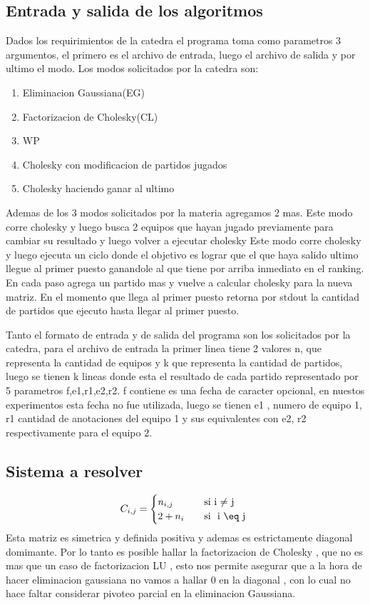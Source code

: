 \subsection{Entrada y salida de los algoritmos}

Dados los requirimientos de la catedra el programa toma como parametros 3 argumentos, el primero es el archivo de entrada, luego el archivo de salida y
por ultimo el modo. Los modos solicitados por la catedra son:
\begin{enumerate}
    \item Eliminacion Gaussiana(EG)
    \item Factorizacion de Cholesky(CL)
    \item WP
    \item Cholesky con modificacion de partidos jugados
    \item Cholesky haciendo ganar al ultimo
\end{enumerate}
Ademas de los 3 modos solicitados por la materia agregamos 2 mas.
Este modo corre cholesky y luego busca 2 equipos que hayan jugado previamente para cambiar su resultado y luego volver a ejecutar cholesky
Este modo corre cholesky y luego ejecuta un ciclo donde el objetivo es lograr que el que haya salido ultimo llegue al primer puesto ganandole
al que tiene por arriba inmediato en el ranking. En cada paso agrega un partido mas y vuelve a calcular cholesky para la nueva matriz.
En el momento que llega al primer puesto retorna por stdout la cantidad de partidos que ejecuto hasta llegar al primer puesto.

Tanto el formato de entrada y de salida del programa son los solicitados por la catedra, para el archivo de entrada la primer linea tiene 2 valores n,
que representa la cantidad de equipos  y k que representa la cantidad de partidos,
luego se tienen k lineas donde esta el resultado de cada partido representado por 5 parametros f,e1,r1,e2,r2.
f contiene es una fecha de caracter opcional, en nuestos experimentos esta fecha no fue utilizada, luego se tienen e1 , numero de equipo 1,
r1 cantidad de anotaciones del equipo 1 y sus equivalentes con e2, r2 respectivamente para el equipo 2.


\subsection{Sistema a resolver}

\[ C_{i,j} =
    \begin{cases}
        n_{i,j}       & \quad \text{si }  \text{i $\neq$ j}\\
        2+n_i & \quad \text{si } \text{ i $\eq$ j }\\
    \end{cases}

    \]
Esta matriz es simetrica y definida positiva y ademas es estrictamente diagonal domimante.
Por lo tanto es posible hallar la factorizacion de Cholesky , que no es mas que un caso
de factorizacion LU , esto nos permite asegurar que a la hora de hacer eliminacion 
gaussiana no vamos a hallar 0 en la diagonal , con lo cual no hace faltar considerar
pivoteo parcial en la eliminacion Gaussiana.  

